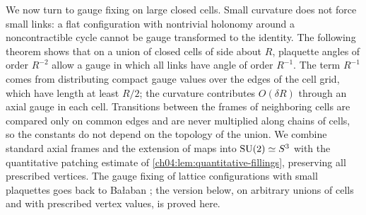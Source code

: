We now turn to gauge fixing on large closed cells. Small curvature does not force small links: a flat configuration with nontrivial holonomy around a noncontractible cycle cannot be gauge transformed to the identity. The following theorem shows that on a union of closed cells of side about $R$, plaquette angles of order $R^{-2}$ allow a gauge in which all links have angle of order $R^{-1}$. The term $R^{-1}$ comes from distributing compact gauge values over the edges of the cell grid, which have length at least $R/2$; the curvature contributes $O(\delta R)$ through an axial gauge in each cell. Transitions between the frames of neighboring cells are compared only on common edges and are never multiplied along chains of cells, so the constants do not depend on the topology of the union. We combine standard axial frames and the extension of maps into $\mathrm{SU}(2)\simeq S^3$ with the quantitative patching estimate of \cref{ch04:lem:quantitative-fillings}, preserving all prescribed vertices. The gauge fixing of lattice configurations with small plaquettes goes back to Bałaban \cite{Balaban1985Regular}; the version below, on arbitrary unions of cells and with prescribed vertex values, is proved here.

